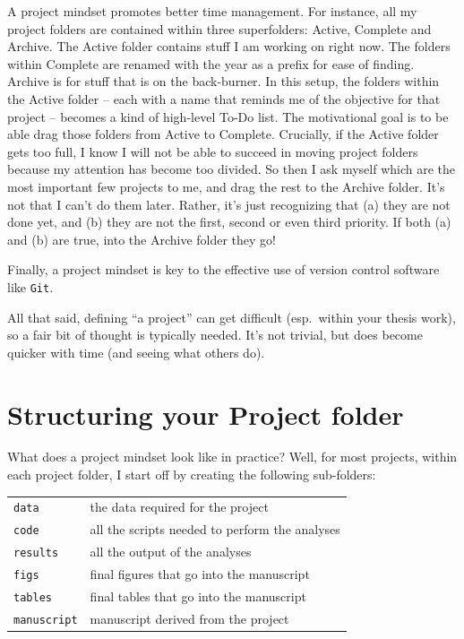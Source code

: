 \documentclass[12pt,letterpaper]{article}
\begin{document}
A project mindset promotes better time management. 
For instance, all my project folders are contained within three superfolders: 
Active, Complete and Archive. 
The Active folder contains stuff I am working on right now.
The folders within Complete are renamed with the year as a prefix for ease of finding. 
Archive is for stuff that is on the back-burner. 
In this setup, 
the folders within the Active folder 
-- each with a name that reminds me of the objective for that project -- 
becomes a kind of high-level To-Do list. 
The motivational goal is to be able drag those folders from Active to Complete. 
Crucially, if the Active folder gets too full, 
I know I will not be able to succeed in moving project folders because my attention has become too divided. 
So then I ask myself which are the most important few projects to me, 
and drag the rest to the Archive folder. 
It's not that I can't do them later. 
Rather, it's just recognizing that 
(a) they are not done yet, and 
(b) they are not the first, second or even third priority. 
If both (a) and (b) are true, into the Archive folder they go!

Finally, a project mindset is key to the effective use of version control software like \texttt{Git}.
	
All that said, defining ``a project'' can get difficult 
(esp.~within your thesis work), 
so a fair bit of thought is typically needed.
It's not trivial, but does become quicker with time (and seeing what others do).


\section{Structuring your Project folder} \label{projectfolder}

What does a project mindset look like in practice?
Well, for most projects, within each project folder, 
I start off by creating the following sub-folders:

\begin{tabular}{ll}
 \texttt{data} & the data required for the project \\
 \texttt{code} & all the scripts needed to perform the analyses \\
 \texttt{results} & all the output of the analyses \\
 \texttt{figs} & final figures that go into the manuscript\\
 \texttt{tables} & final tables that go into the manuscript\\
 \texttt{manuscript} & manuscript derived from the project\\
\end{tabular}
\end{document}
